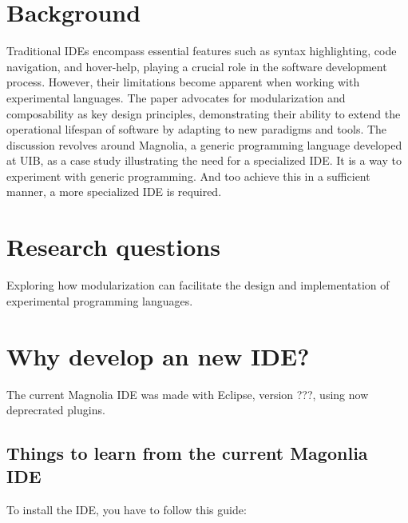 \documentclass[runningheads]{llncs}
\begin{document}
\section{Background}

Traditional IDEs encompass essential features such as syntax highlighting, code
navigation, and hover-help, playing a crucial role in the software development
process. However, their limitations become apparent when working with
experimental languages.
The paper advocates for modularization and composability
as key design principles, demonstrating their ability to extend the operational
lifespan of software by adapting to new paradigms and tools. The discussion
revolves around Magnolia, a generic programming language developed at UIB, as a
case study illustrating the need for a specialized IDE. It is a way to
experiment with generic programming. And too achieve this in a sufficient
manner, a more specialized IDE is required.

\section{Research questions}

Exploring how modularization can facilitate the design and implementation of
experimental programming languages.

\section{Why develop an new IDE?}
The current Magnolia IDE was made with Eclipse, version ???, using now
deprecrated plugins. %

\subsection{Things to learn from the current Magonlia IDE}
To install the IDE, you have to follow this guide:
\end{document}
